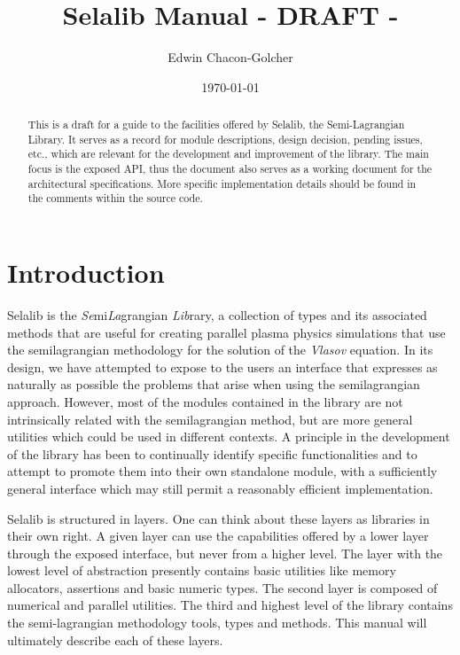 \documentclass[]{report}   %
\begin{document}
\title{Selalib Manual - DRAFT -}
\author{Edwin Chacon-Golcher}        
\date{\today}    
\maketitle

\begin{abstract}
 This is a draft for a guide to the facilities offered by Selalib, the Semi-Lagrangian Library. It serves as a record for module descriptions, design decision, pending issues, etc., which are relevant for the development and improvement of the library. The main focus is the exposed API, thus the document also serves as a working document for the architectural specifications. More specific implementation details should be found in the comments within the source code. 
\end{abstract}

\tableofcontents

\chapter{Introduction}             %
Selalib is the \emph{Se}mi\emph{La}grangian \emph{Lib}rary, a collection of types and its associated methods that are useful for creating parallel plasma physics simulations that use the semilagrangian methodology for the solution of the \emph{Vlasov} equation. In its design, we have attempted to expose to the users an interface that expresses as naturally as possible the problems that arise when using the semilagrangian approach. However, most of the modules contained in the library are not intrinsically related with the semilagrangian method, but are more general utilities which could be used in different contexts. A principle in the development of the library has been to continually identify specific functionalities and to attempt to promote them into their own standalone module, with a sufficiently general interface which may still permit a reasonably efficient implementation.

Selalib is structured in layers. One can think about these layers as libraries in their own right. A given layer can use the capabilities offered by a lower layer through the exposed interface, but never from a higher level. The layer with the lowest level of abstraction presently contains basic utilities like memory allocators, assertions and basic numeric types. The second layer is composed of numerical and parallel utilities. The third and highest level of the library contains the semi-lagrangian methodology tools, types and methods. This manual will ultimately describe each of these layers.
\end{document}

